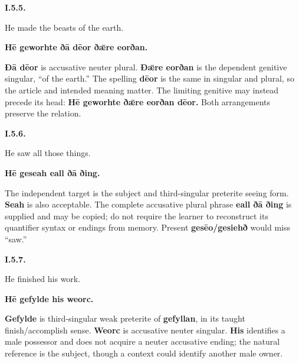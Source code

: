 \par\begin{minipage}{\linewidth}\raggedright
\textbf{I.5.5.}

He made the beasts of the earth.

\textbf{Hē geworhte ðā dēor ðǣre eorðan.}

\textbf{Ðā dēor} is accusative neuter plural. \textbf{Ðǣre eorðan} is the dependent genitive singular, “of the earth.” The spelling \textbf{dēor} is the same in singular and plural, so the article and intended meaning matter. The limiting genitive may instead precede its head: \textbf{Hē geworhte ðǣre eorðan dēor.} Both arrangements preserve the relation.

\end{minipage}\par\addvspace{4pt}

\par\begin{minipage}{\linewidth}\raggedright
\textbf{I.5.6.}

He saw all those things.

\textbf{Hē geseah eall ðā ðing.}

The independent target is the subject and third-singular preterite seeing form. \textbf{Seah} is also acceptable. The complete accusative plural phrase \textbf{eall ðā ðing} is supplied and may be copied; do not require the learner to reconstruct its quantifier syntax or endings from memory. Present \textbf{gesēo/\allowbreak{}gesiehð} would miss “saw.”

\end{minipage}\par\addvspace{4pt}

\par\begin{minipage}{\linewidth}\raggedright
\textbf{I.5.7.}

He finished his work.

\textbf{Hē gefylde his weorc.}

\textbf{Gefylde} is third-singular weak preterite of \textbf{gefyllan}, in its taught finish/\allowbreak{}accomplish sense. \textbf{Weorc} is accusative neuter singular. \textbf{His} identifies a male possessor and does not acquire a neuter accusative ending; the natural reference is the subject, though a context could identify another male owner.

\end{minipage}\par\addvspace{4pt}

